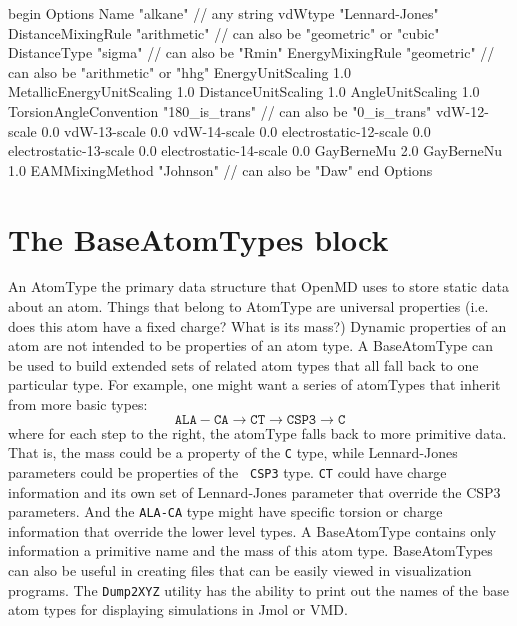 \documentclass[]{book}
\begin{document}
\begin{code}[caption={[A force field Options block showing default values
for many force field options.] A force field Options block showing default values
for many force field options.  Most of these options do not need to be
specified if the default values are working.},
label={sch:optionsBlock}] 
begin Options
 Name                      "alkane"       // any string
 vdWtype                   "Lennard-Jones" 
 DistanceMixingRule        "arithmetic"   // can also be "geometric" or "cubic"
 DistanceType              "sigma"        // can also be "Rmin"
 EnergyMixingRule          "geometric"    // can also be "arithmetic" or "hhg"
 EnergyUnitScaling         1.0
 MetallicEnergyUnitScaling 1.0
 DistanceUnitScaling       1.0
 AngleUnitScaling          1.0
 TorsionAngleConvention    "180_is_trans" // can also be "0_is_trans"
 vdW-12-scale              0.0
 vdW-13-scale              0.0
 vdW-14-scale              0.0
 electrostatic-12-scale    0.0
 electrostatic-13-scale    0.0
 electrostatic-14-scale    0.0
 GayBerneMu                2.0
 GayBerneNu                1.0
 EAMMixingMethod           "Johnson"      // can also be "Daw"
end Options
\end{code}

\section{\label{section:ffBase}The BaseAtomTypes block}

An AtomType the primary data structure that OpenMD uses to store
static data about an atom.  Things that belong to AtomType are
universal properties (i.e. does this atom have a fixed charge?  What
is its mass?)  Dynamic properties of an atom are not intended to be
properties of an atom type.  A BaseAtomType can be used to build
extended sets of related atom types that all fall back to one
particular type.  For example, one might want a series of atomTypes
that inherit from more basic types:
\begin{displaymath}
\mathtt{ALA-CA} \rightarrow \mathtt{CT} \rightarrow \mathtt{CSP3} \rightarrow \mathtt{C}
\end{displaymath}
where for each step to the right, the atomType falls back to more
primitive data.  That is, the mass could be a property of the {\tt C}
type, while Lennard-Jones parameters could be properties of the {\tt
  CSP3} type.  {\tt CT} could have charge information and its own set
of Lennard-Jones parameter that override the CSP3 parameters.  And the
{\tt ALA-CA} type might have specific torsion or charge information
that override the lower level types.  A BaseAtomType contains only
information a primitive name and the mass of this atom type.
BaseAtomTypes can also be useful in creating files that can be easily
viewed in visualization programs.  The {\tt Dump2XYZ} utility has the
ability to print out the names of the base atom types for displaying
simulations in Jmol or VMD.
\end{document}
